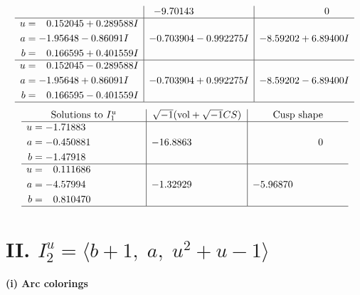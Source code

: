 \documentclass[1p]{elsarticle_modified}
\theoremstyle{definition}
\newcommand{\I}{\sqrt{-1}}
\begin{document}
$$\begin{array}{c|c|c}
 & -9.70143\phantom{ +0.000000I} & \phantom{-0.000000 } 0 \\ \hline\begin{aligned}
u &= \phantom{-}0.152045 + 0.289588 I \\
a &= -1.95648 - 0.86091 I \\
b &= \phantom{-}0.166595 + 0.401559 I\end{aligned}
 & -0.703904 - 0.992275 I & -8.59202 + 6.89400 I \\ \hline\begin{aligned}
u &= \phantom{-}0.152045 - 0.289588 I \\
a &= -1.95648 + 0.86091 I \\
b &= \phantom{-}0.166595 - 0.401559 I\end{aligned}
 & -0.703904 + 0.992275 I & -8.59202 - 6.89400 I\\
 \hline 
 \end{array}$$\newpage$$\begin{array}{c|c|c}  
\text{Solutions to }I^u_{1}& \I (\text{vol} + \sqrt{-1}CS) & \text{Cusp shape}\\
 \hline 
\begin{aligned}
u &= -1.71883\phantom{ +0.000000I} \\
a &= -0.450881\phantom{ +0.000000I} \\
b &= -1.47918\phantom{ +0.000000I}\end{aligned}
 & -16.8863\phantom{ +0.000000I} & \phantom{-0.000000 } 0 \\ \hline\begin{aligned}
u &= \phantom{-}0.111686\phantom{ +0.000000I} \\
a &= -4.57994\phantom{ +0.000000I} \\
b &= \phantom{-}0.810470\phantom{ +0.000000I}\end{aligned}
 & -1.32929\phantom{ +0.000000I} & -5.96870\phantom{ +0.000000I}\\
 \hline 
 \end{array}$$\newpage\newpage\renewcommand{\arraystretch}{1}
\centering \section*{II. $I^u_{2}= \langle b+1,\;a,\;u^2+u-1 \rangle$}
\flushleft \textbf{(i) Arc colorings}\\
\end{document}
